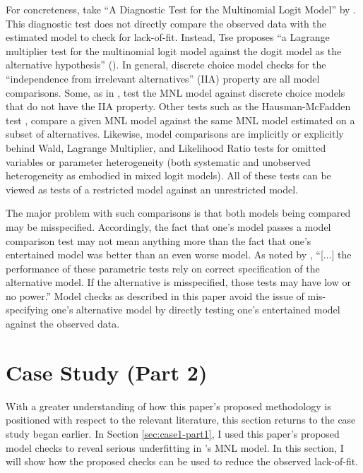 \documentclass[preprint]{elsarticle}
\begin{document}
For concreteness, take ``A Diagnostic Test for the Multinomial Logit Model'' by \citet{tse_diagnostic_1987}. This diagnostic test does not directly compare the observed data with the estimated model to check for lack-of-fit. Instead, Tse proposes ``a Lagrange multiplier test for the multinomial logit model against the dogit model as the alternative hypothesis'' (\citeyear{tse_diagnostic_1987}). In general, discrete choice model checks for the ``independence from irrelevant alternatives'' (IIA) property are all model comparisons. Some, as in \citet{tse_diagnostic_1987}, test the MNL model against discrete choice models that do not have the IIA property. Other tests such as the Hausman-McFadden test \citep{hausman_specification_1984}, compare a given MNL model against the same MNL model estimated on a subset of alternatives. Likewise, model comparisons are implicitly or explicitly behind Wald, Lagrange Multiplier, and Likelihood Ratio tests for omitted variables or parameter heterogeneity (both systematic and unobserved heterogeneity as embodied in mixed logit models). All of these tests can be viewed as tests of a restricted model against an unrestricted model.

The major problem with such comparisons is that both models being compared may be misspecified. Accordingly, the fact that one's model passes a model comparison test may not mean anything more than the fact that one's entertained model was better than an even worse model. As noted by \citet{zheng_testing_2008}, ``[...] the performance of these parametric tests rely on correct specification of the alternative model. If the alternative is misspecified, those tests may have low or no power.'' Model checks as described in this paper avoid the issue of mis-specifying one's alternative model by directly testing one's entertained model against the observed data.

\section{Case Study (Part 2)}
\label{sec:case-study-part2}
With a greater understanding of how this paper's proposed methodology is positioned with respect to the relevant literature, this section returns to the case study began earlier. In Section \ref{sec:case1-part1}, I used this paper's proposed model checks to reveal serious underfitting in \citeauthor{brownstone_forecasting_1998}'s MNL model. In this section, I will show how the proposed checks can be used to reduce the observed lack-of-fit.
\end{document}
